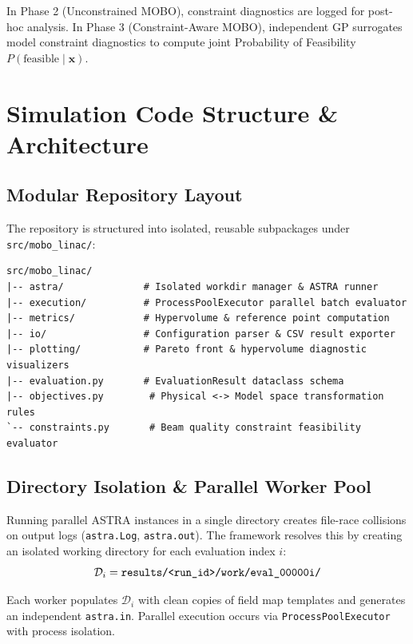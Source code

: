 \documentclass[11pt,a4paper]{article}
\begin{document}
In Phase 2 (Unconstrained MOBO), constraint diagnostics are logged for post-hoc analysis. In Phase 3 (Constraint-Aware MOBO), independent GP surrogates model constraint diagnostics to compute joint Probability of Feasibility $P(\text{feasible} \mid \mathbf{x})$.

\section{Simulation Code Structure \& Architecture}
\label{sec:architecture}

\subsection{Modular Repository Layout}
The repository is structured into isolated, reusable subpackages under \texttt{src/mobo\_linac/}:

\begin{lstlisting}[caption={Core software package module structure.}]
src/mobo_linac/
|-- astra/              # Isolated workdir manager & ASTRA runner
|-- execution/          # ProcessPoolExecutor parallel batch evaluator
|-- metrics/            # Hypervolume & reference point computation
|-- io/                 # Configuration parser & CSV result exporter
|-- plotting/           # Pareto front & hypervolume diagnostic visualizers
|-- evaluation.py       # EvaluationResult dataclass schema
|-- objectives.py        # Physical <-> Model space transformation rules
`-- constraints.py       # Beam quality constraint feasibility evaluator
\end{lstlisting}

\subsection{Directory Isolation \& Parallel Worker Pool}
Running parallel ASTRA instances in a single directory creates file-race collisions on output logs (\texttt{astra.Log}, \texttt{astra.out}). The framework resolves this by creating an isolated working directory for each evaluation index $i$:
\begin{equation}
    \mathcal{D}_i = \text{\texttt{results/<run\_id>/work/eval\_00000i/}}
\end{equation}

Each worker populates $\mathcal{D}_i$ with clean copies of field map templates and generates an independent \texttt{astra.in}. Parallel execution occurs via \texttt{ProcessPoolExecutor} with process isolation.
\end{document}
